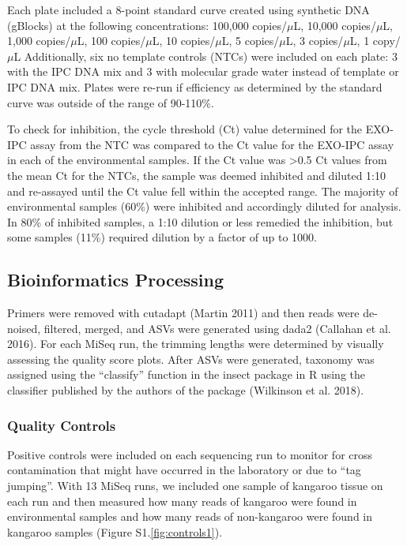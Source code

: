 \documentclass[
]{article}
\begin{document}
Each plate included a 8-point standard curve created using synthetic DNA
(gBlocks) at the following concentrations: 100,000 copies/\(\mu\)L,
10,000 copies/\(\mu\)L, 1,000 copies/\(\mu\)L, 100 copies/\(\mu\)L, 10
copies/\(\mu\)L, 5 copies/\(\mu\)L, 3 copies/\(\mu\)L, 1 copy/\(\mu\)L
Additionally, six no template controls (NTCs) were included on each
plate: 3 with the IPC DNA mix and 3 with molecular grade water instead
of template or IPC DNA mix. Plates were re-run if efficiency as
determined by the standard curve was outside of the range of 90-110\%.

To check for inhibition, the cycle threshold (Ct) value determined for
the EXO-IPC assay from the NTC was compared to the Ct value for the
EXO-IPC assay in each of the environmental samples. If the Ct value was
\textgreater0.5 Ct values from the mean Ct for the NTCs, the sample was
deemed inhibited and diluted 1:10 and re-assayed until the Ct value fell
within the accepted range. The majority of environmental samples (60\%)
were inhibited and accordingly diluted for analysis. In 80\% of
inhibited samples, a 1:10 dilution or less remedied the inhibition, but
some samples (11\%) required dilution by a factor of up to 1000.

\hypertarget{bioinformatics-processing}{%
\subsection{Bioinformatics Processing}\label{bioinformatics-processing}}

Primers were removed with cutadapt (Martin 2011) and then reads were
de-noised, filtered, merged, and ASVs were generated using dada2
(Callahan et al. 2016). For each MiSeq run, the trimming lengths were
determined by visually assessing the quality score plots. After ASVs
were generated, taxonomy was assigned using the ``classify'' function in
the insect package in R using the classifier published by the authors of
the package (Wilkinson et al. 2018).

\hypertarget{quality-controls}{%
\subsubsection{Quality Controls}\label{quality-controls}}

Positive controls were included on each sequencing run to monitor for
cross contamination that might have occurred in the laboratory or due to
``tag jumping''. With 13 MiSeq runs, we included one sample of kangaroo
tissue on each run and then measured how many reads of kangaroo were
found in environmental samples and how many reads of non-kangaroo were
found in kangaroo samples (Figure S1.\ref{fig:controls1}).
\end{document}
